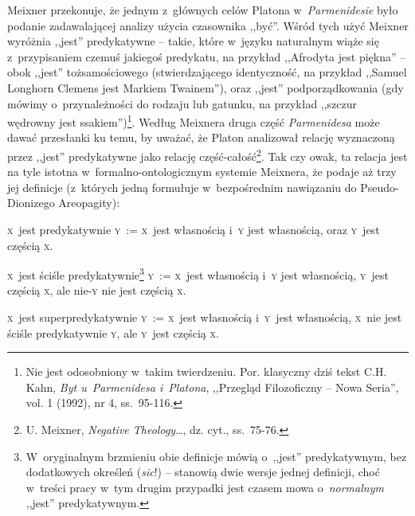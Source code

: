 Meixner przekonuje, że jednym z~głównych celów Platona w~\textit{Parmenidesie} było podanie zadawalającej analizy użycia czasownika ,,być''. Wśród tych użyć Meixner wyróżnia ,,jest'' predykatywne -- takie, które w~języku naturalnym wiąże się z~przypisaniem czemuś jakiegoś predykatu, na przykład ,,Afrodyta jest piękna'' -- obok ,,jest'' tożsamościowego (stwierdzającego identyczność, na przykład ,,Samuel Longhorn Clemens jest Markiem Twainem''), oraz ,,jest'' podporządkowania (gdy mówimy o~przynależności do rodzaju lub gatunku, na przykład ,,szczur wędrowny jest ssakiem'')\footnote{Nie jest odosobniony w~takim twierdzeniu. Por. klasyczny dziś tekst C.H. Kahn, \textit{Byt u~Parmenidesa i~Platona}, ,,Przegląd Filozoficzny -- Nowa Seria'', vol. 1 (1992), nr 4, ss.~95-116.}. Według Meixnera druga część \textit{Parmenidesa} może dawać przesłanki ku temu, by uważać, że Platon analizował relację wyznaczoną przez ,,jest'' predykatywne jako relację część-całość\footnote{U. Meixner, \textit{Negative Theology}\ldots, dz. cyt., ss.~75-76.}. Tak czy owak, ta relacja jest na tyle istotna w~formalno-ontologicznym systemie Meixnera, że podaje aż trzy jej definicje (z~których jedną formułuje w~bezpośrednim nawiązaniu do Pseudo-Dionizego Areopagity):
\begin{defin}\label{mei-def3}
\textsc{x}~jest predykatywnie \textsc{y}~:= \textsc{x}~jest własnością i~\textsc{y} jest własnością, oraz \textsc{y}~jest częścią \textsc{x}.
\end{defin}
\begin{defin}\label{mei-def4}
\textsc{x}~jest ściśle predykatywnie\footnote{W~oryginalnym brzmieniu obie definicje mówią o~,,jest'' predykatywnym, bez dodatkowych określeń (\textit{\textit{sic}}!) -- stanowią dwie wersje jednej definicji, choć w~treści pracy w~tym drugim przypadki jest czasem mowa o~\textit{normalnym} ,,jest'' predykatywnym.} \textsc{y}~:= \textsc{x}~jest własnością i~\textsc{y} jest własnością, \textsc{y}~jest częścią \textsc{x}, ale nie-\textsc{y} nie jest częścią \textsc{x}.
\end{defin}
\begin{defin}\label{mei-def5}
\textsc{x}~jest superpredykatywnie \textsc{y}~:= \textsc{x}~jest własnością i~\textsc{y}~jest własnością, \textsc{x}~nie jest ściśle predykatywnie \textsc{y}, ale \textsc{y}~jest częścią \textsc{x}.
\end{defin}

